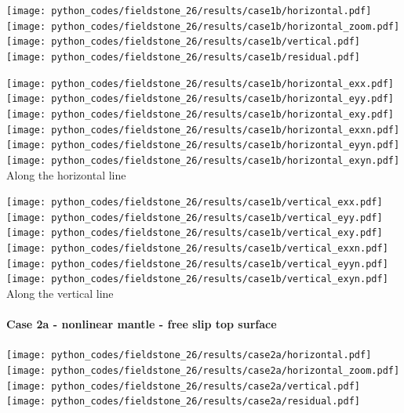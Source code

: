 \begin{center}
\texttt{[image: python\_codes/fieldstone\_26/results/case1b/horizontal.pdf]}
\texttt{[image: python\_codes/fieldstone\_26/results/case1b/horizontal\_zoom.pdf]}\\
\texttt{[image: python\_codes/fieldstone\_26/results/case1b/vertical.pdf]}
\texttt{[image: python\_codes/fieldstone\_26/results/case1b/residual.pdf]}
\end{center}

\begin{center}
\texttt{[image: python\_codes/fieldstone\_26/results/case1b/horizontal\_exx.pdf]}
\texttt{[image: python\_codes/fieldstone\_26/results/case1b/horizontal\_eyy.pdf]}
\texttt{[image: python\_codes/fieldstone\_26/results/case1b/horizontal\_exy.pdf]}\\
\texttt{[image: python\_codes/fieldstone\_26/results/case1b/horizontal\_exxn.pdf]}
\texttt{[image: python\_codes/fieldstone\_26/results/case1b/horizontal\_eyyn.pdf]}
\texttt{[image: python\_codes/fieldstone\_26/results/case1b/horizontal\_exyn.pdf]}\\
{\captionfont Along the horizontal line}
\end{center}

\begin{center}
\texttt{[image: python\_codes/fieldstone\_26/results/case1b/vertical\_exx.pdf]}
\texttt{[image: python\_codes/fieldstone\_26/results/case1b/vertical\_eyy.pdf]}
\texttt{[image: python\_codes/fieldstone\_26/results/case1b/vertical\_exy.pdf]}\\
\texttt{[image: python\_codes/fieldstone\_26/results/case1b/vertical\_exxn.pdf]}
\texttt{[image: python\_codes/fieldstone\_26/results/case1b/vertical\_eyyn.pdf]}
\texttt{[image: python\_codes/fieldstone\_26/results/case1b/vertical\_exyn.pdf]}\\
{\captionfont Along the vertical line}
\end{center}

\newpage
\paragraph{Case 2a - nonlinear mantle - free slip top surface} 

\begin{center}
\texttt{[image: python\_codes/fieldstone\_26/results/case2a/horizontal.pdf]}
\texttt{[image: python\_codes/fieldstone\_26/results/case2a/horizontal\_zoom.pdf]}\\
\texttt{[image: python\_codes/fieldstone\_26/results/case2a/vertical.pdf]}
\texttt{[image: python\_codes/fieldstone\_26/results/case2a/residual.pdf]}
\end{center}

